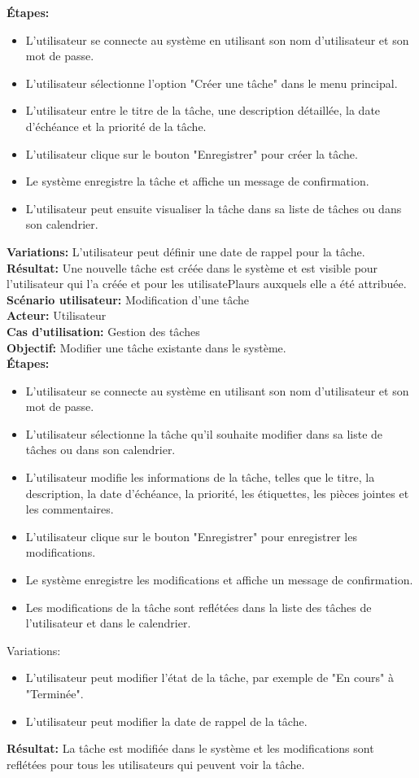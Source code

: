\documentclass[a4paper,12pt]{report}
\begin{document}
\textbf{Étapes:}
\begin{itemize}
    \item L'utilisateur se connecte au système en utilisant son nom d'utilisateur et son mot de passe.
    \item L'utilisateur sélectionne l'option "Créer une tâche" dans le menu principal.
    \item L'utilisateur entre le titre de la tâche, une description détaillée, la date d'échéance et la priorité de la tâche.
    \item L'utilisateur clique sur le bouton "Enregistrer" pour créer la tâche.
    \item Le système enregistre la tâche et affiche un message de confirmation.
    \item L'utilisateur peut ensuite visualiser la tâche dans sa liste de tâches ou dans son calendrier.
\end{itemize}
\textbf{Variations:}
    L'utilisateur peut définir une date de rappel pour la tâche.
\textbf{Résultat:}
    Une nouvelle tâche est créée dans le système et est visible pour l'utilisateur qui l'a créée et pour les utilisatePlaurs auxquels elle a été attribuée.\\

\textbf{Scénario utilisateur:} Modification d'une tâche\\
\textbf{Acteur:} Utilisateur\\
\textbf{Cas d'utilisation:} Gestion des tâches\\
\textbf{Objectif:} Modifier une tâche existante dans le système.\\
\textbf{Étapes:}
\begin{itemize}
    \item L'utilisateur se connecte au système en utilisant son nom d'utilisateur et son mot de passe.
    \item L'utilisateur sélectionne la tâche qu'il souhaite modifier dans sa liste de tâches ou dans son calendrier.
    \item L'utilisateur modifie les informations de la tâche, telles que le titre, la description, la date d'échéance, la priorité, les étiquettes, les pièces jointes et les commentaires.
    \item L'utilisateur clique sur le bouton "Enregistrer" pour enregistrer les modifications.
    \item Le système enregistre les modifications et affiche un message de confirmation.
    \item Les modifications de la tâche sont reflétées dans la liste des tâches de l'utilisateur et dans le calendrier.
\end{itemize}
Variations:
\begin{itemize}
    \item L'utilisateur peut modifier l'état de la tâche, par exemple de "En cours" à "Terminée".
    \item L'utilisateur peut modifier la date de rappel de la tâche.
\end{itemize}
\textbf{Résultat:}
    La tâche est modifiée dans le système et les modifications sont reflétées pour tous les utilisateurs qui peuvent voir la tâche.\\
\end{document}
